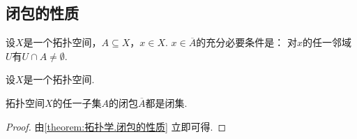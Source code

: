 \subsection{闭包的性质}
\begin{proposition}\label{theorem:拓扑学.一点属于闭包的充分必要条件}
设\(X\)是一个拓扑空间，\(A \subseteq X\)，\(x \in X\).
\(x \in \overline{A}\)的充分必要条件是：
对\(x\)的任一邻域\(U\)有\(U \cap A \neq \emptyset\).
\end{proposition}

\begin{theorem}\label{theorem:拓扑学.闭包的性质}
设\(X\)是一个拓扑空间.
\end{theorem}

\begin{corollary}\label{theorem:拓扑学.拓扑空间子集闭包都是闭集}
拓扑空间\(X\)的任一子集\(A\)的闭包\(\overline{A}\)都是闭集.
\begin{proof}
由\cref{theorem:拓扑学.闭包的性质} 立即可得.
\end{proof}
\end{corollary}

